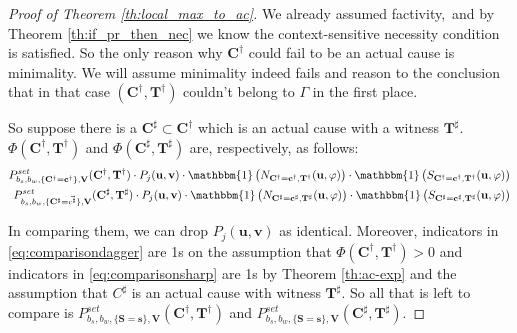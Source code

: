 \documentclass[twoside,11pt]{article}
\begin{document}
\begin{proof}[Proof of Theorem \ref{th:local_max_to_ac}]
We already assumed factivity, and by Theorem \ref{th:if_pr_then_nec} we know the context-sensitive necessity condition is satisfied. So the only reason why $\mathbf{C^\dagger}$ could fail to be an actual cause is minimality. We will assume minimality indeed fails and reason to the conclusion that in that case $(\mathbf{C^\dagger}, \mathbf{T^\dagger})$ couldn't belong to $\Gamma$ in the first place.


So suppose there is a $\mathbf{C^\sharp} \subset \mathbf{C^\dagger}$ which is an actual cause with a witness $\mathbf{T^\sharp}$. $\Phi(\mathbf{C^\dagger}, \mathbf{T^\dagger})$ and $\Phi(\mathbf{C^\sharp}, \mathbf{T^\sharp})$ are, respectively, as follows:
\begin{align}
P^{\mathit{set}}_{b_s,b_w, \{\mathbf{C^\dagger}=\mathbf{c^\dagger}\}, \mathbf{V}}(\mathbf{C^\dagger},\mathbf{T^\dagger}) \cdot P_j(\mathbf{u}, \mathbf{v}) \cdot \mathbbm{1}\left(N_{\mathbf{C^\dagger} = \mathbf{c^\dagger}, \mathbf{T^\dagger}}(\mathbf{u}, \varphi)\right) \cdot \mathbbm{1}\left(S_{\mathbf{C^\dagger} = \mathbf{c^\dagger}, \mathbf{T^\dagger}}(\mathbf{u}, \varphi)\right)  \label{eq:comparisondagger}\\
P^{\mathit{set}}_{b_s,b_w, \{\mathbf{C^\sharp}=\vec {c^\sharp}\}, \mathbf{V}}(\mathbf{C^\sharp},\mathbf{T^\sharp}) \cdot P_j(\mathbf{u}, \mathbf{v}) \cdot \mathbbm{1}\left(N_{\mathbf{C^\sharp} = \mathbf{c^\sharp}, \mathbf{T^\sharp}}(\mathbf{u}, \varphi)\right) \cdot \mathbbm{1}\left(S_{\mathbf{C^\sharp} = \mathbf{c^\sharp}, \mathbf{T^\sharp}}(\mathbf{u}, \varphi)\right) \label{eq:comparisonsharp}
\end{align}

\noindent In comparing them, we can drop  $P_j(\mathbf{u}, \mathbf{v})$ as identical. Moreover, indicators in \eqref{eq:comparisondagger} are 1s on the assumption that $\Phi(\mathbf{C^\dagger}, \mathbf{T^\dagger})>0$ and indicators in \eqref{eq:comparisonsharp} are 1s by Theorem \ref{th:ac-exp} and the assumption that $C^\sharp$ is an actual cause with witness $\mathbf{T^\sharp}$.  So all that is left to compare is $P^{\mathit{set}}_{b_s,b_w, \{\mathbf{S}=\mathbf{s}\}, \mathbf{V}}(\mathbf{C^\dagger},\mathbf{T^\dagger})$ and  $P^{\mathit{set}}_{b_s,b_w, \{\mathbf{S}=\mathbf{s}\}, \mathbf{V}}(\mathbf{C^\sharp},\mathbf{T^\sharp})$.


\end{proof}
\end{document}
